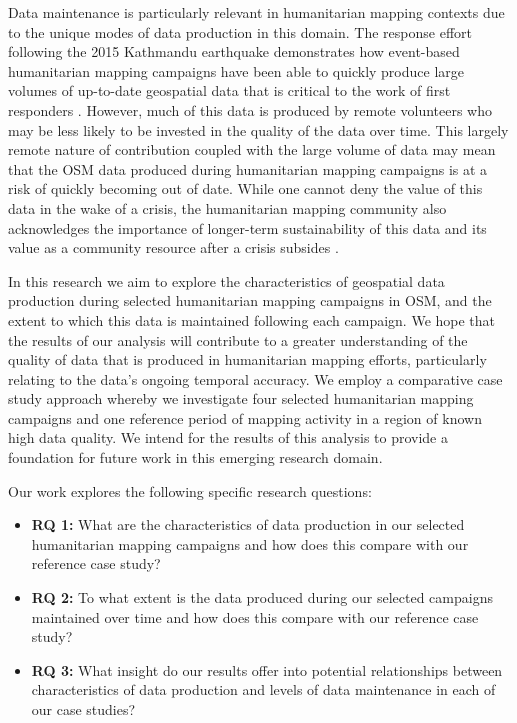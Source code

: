 Data maintenance is particularly relevant in humanitarian mapping contexts due to the unique modes of data production in this domain. The response effort following the 2015 Kathmandu earthquake demonstrates how event-based humanitarian mapping campaigns have been able to quickly produce large volumes of up-to-date geospatial data that is critical to the work of first responders \parencite{soden_infrastructure_2016}. However, much of this data is produced by remote volunteers \parencite{eckle_quality_2015} who may be less likely to be invested in the quality of the data over time. This largely remote nature of contribution coupled with the large volume of data may mean that the OSM data produced during humanitarian mapping campaigns is at a risk of quickly becoming out of date. While one cannot deny the value of this data in the wake of a crisis, the humanitarian mapping community also acknowledges the importance of longer-term sustainability of this data and its value as a community resource after a crisis subsides \parencite{soden_crowdsourced_2014}. 

In this research we aim to explore the characteristics of geospatial data production during selected humanitarian mapping campaigns in OSM, and the extent to which this data is maintained following each campaign. We hope that the results of our analysis will contribute to a greater understanding of the quality of data that is produced in humanitarian mapping efforts, particularly relating to the data’s ongoing temporal accuracy. We employ a comparative case study approach whereby we investigate four selected humanitarian mapping campaigns and one reference period of mapping activity in a region of known high data quality. We intend for the results of this analysis to provide a foundation for future work in this emerging research domain. 

Our work explores the following specific research questions: 

\begin{itemize}
    \item \textbf{RQ 1:} What are the characteristics of data production in our selected humanitarian mapping campaigns and how does this compare with our reference case study?
    \item \textbf{RQ 2:} To what extent is the data produced during our selected campaigns maintained over time and how does this compare with our reference case study? 
    \item \textbf{RQ 3:} What insight do our results offer into potential relationships between characteristics of data production and levels of data maintenance in each of our case studies? 
\end{itemize}

